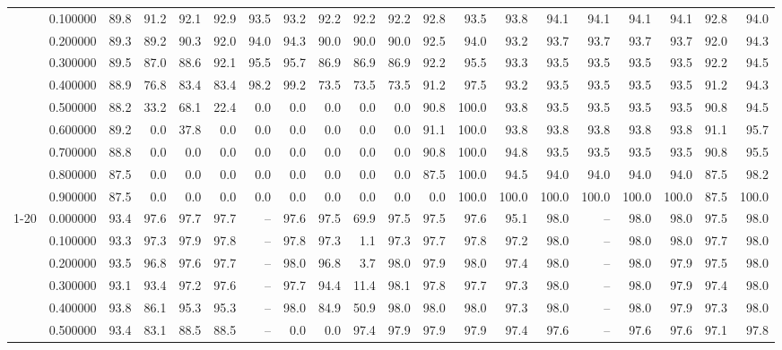 \begin{tabular}{llrrrrrrrrrrrrrrrrrr}
 & 0.100000 & 89.8 & 91.2 & 92.1 & 92.9 & 93.5 & 93.2 & 92.2 & 92.2 & 92.2 & 92.8 & 93.5 & 93.8 & 94.1 & 94.1 & 94.1 & 94.1 & 92.8 & 94.0 \\
 & 0.200000 & 89.3 & 89.2 & 90.3 & 92.0 & 94.0 & 94.3 & 90.0 & 90.0 & 90.0 & 92.5 & 94.0 & 93.2 & 93.7 & 93.7 & 93.7 & 93.7 & 92.0 & 94.3 \\
 & 0.300000 & 89.5 & 87.0 & 88.6 & 92.1 & 95.5 & 95.7 & 86.9 & 86.9 & 86.9 & 92.2 & 95.5 & 93.3 & 93.5 & 93.5 & 93.5 & 93.5 & 92.2 & 94.5 \\
 & 0.400000 & 88.9 & 76.8 & 83.4 & 83.4 & 98.2 & 99.2 & 73.5 & 73.5 & 73.5 & 91.2 & 97.5 & 93.2 & 93.5 & 93.5 & 93.5 & 93.5 & 91.2 & 94.3 \\
 & 0.500000 & 88.2 & 33.2 & 68.1 & 22.4 & 0.0 & 0.0 & 0.0 & 0.0 & 0.0 & 90.8 & 100.0 & 93.8 & 93.5 & 93.5 & 93.5 & 93.5 & 90.8 & 94.5 \\
 & 0.600000 & 89.2 & 0.0 & 37.8 & 0.0 & 0.0 & 0.0 & 0.0 & 0.0 & 0.0 & 91.1 & 100.0 & 93.8 & 93.8 & 93.8 & 93.8 & 93.8 & 91.1 & 95.7 \\
 & 0.700000 & 88.8 & 0.0 & 0.0 & 0.0 & 0.0 & 0.0 & 0.0 & 0.0 & 0.0 & 90.8 & 100.0 & 94.8 & 93.5 & 93.5 & 93.5 & 93.5 & 90.8 & 95.5 \\
 & 0.800000 & 87.5 & 0.0 & 0.0 & 0.0 & 0.0 & 0.0 & 0.0 & 0.0 & 0.0 & 87.5 & 100.0 & 94.5 & 94.0 & 94.0 & 94.0 & 94.0 & 87.5 & 98.2 \\
 & 0.900000 & 87.5 & 0.0 & 0.0 & 0.0 & 0.0 & 0.0 & 0.0 & 0.0 & 0.0 & 0.0 & 100.0 & 100.0 & 100.0 & 100.0 & 100.0 & 100.0 & 87.5 & 100.0 \\
\cline{1-20}
\multirow[t]{10}{*}{gsm8k} & 0.000000 & 93.4 & 97.6 & 97.7 & 97.7 & -- & 97.6 & 97.5 & 69.9 & 97.5 & 97.5 & 97.6 & 95.1 & 98.0 & -- & 98.0 & 98.0 & 97.5 & 98.0 \\
 & 0.100000 & 93.3 & 97.3 & 97.9 & 97.8 & -- & 97.8 & 97.3 & 1.1 & 97.3 & 97.7 & 97.8 & 97.2 & 98.0 & -- & 98.0 & 98.0 & 97.7 & 98.0 \\
 & 0.200000 & 93.5 & 96.8 & 97.6 & 97.7 & -- & 98.0 & 96.8 & 3.7 & 98.0 & 97.9 & 98.0 & 97.4 & 98.0 & -- & 98.0 & 97.9 & 97.5 & 98.0 \\
 & 0.300000 & 93.1 & 93.4 & 97.2 & 97.6 & -- & 97.7 & 94.4 & 11.4 & 98.1 & 97.8 & 97.7 & 97.3 & 98.0 & -- & 98.0 & 97.9 & 97.4 & 98.0 \\
 & 0.400000 & 93.8 & 86.1 & 95.3 & 95.3 & -- & 98.0 & 84.9 & 50.9 & 98.0 & 98.0 & 98.0 & 97.3 & 98.0 & -- & 98.0 & 97.9 & 97.3 & 98.0 \\
 & 0.500000 & 93.4 & 83.1 & 88.5 & 88.5 & -- & 0.0 & 0.0 & 97.4 & 97.9 & 97.9 & 97.9 & 97.4 & 97.6 & -- & 97.6 & 97.6 & 97.1 & 97.8 \\

\end{tabular}
